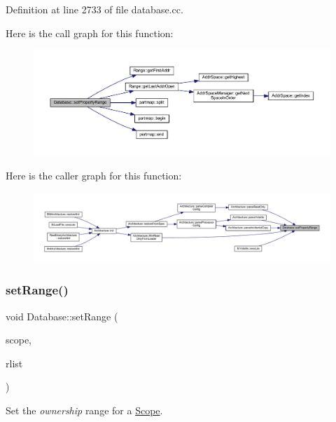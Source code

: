 Definition at line 2733 of file database.\+cc.

Here is the call graph for this function\+:
\nopagebreak
\begin{figure}[H]
\begin{center}
\leavevmode
\includegraphics[width=350pt]{class_database_aca0311269bfa73f5673c998dec92bb95_cgraph}
\end{center}
\end{figure}
Here is the caller graph for this function\+:
\nopagebreak
\begin{figure}[H]
\begin{center}
\leavevmode
\includegraphics[width=350pt]{class_database_aca0311269bfa73f5673c998dec92bb95_icgraph}
\end{center}
\end{figure}
\mbox{\label{class_database_ac4397e487146864510d89c9e3d12a2a7}} 
\subsubsection{\texorpdfstring{setRange()}{setRange()}}
{\footnotesize\ttfamily void Database\+::set\+Range (\begin{DoxyParamCaption}\item[{\mbox{\hyperlink{class_scope}{Scope}} $\ast$}]{scope,  }\item[{const \mbox{\hyperlink{class_range_list}{Range\+List}} \&}]{rlist }\end{DoxyParamCaption})}



Set the {\itshape ownership} range for a \mbox{\hyperlink{class_scope}{Scope}}. 

